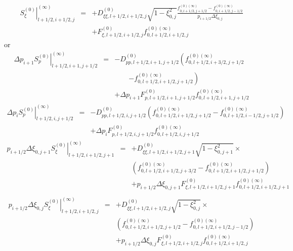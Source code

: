 \begin{eqnarray}
\left. S_{\xi }^{\left( 0\right) }\right| _{l+1/2,i+1/2,j}^{(\infty )}
&=&+D_{\xi \xi ,l+1/2,i+1/2,j}^{\left( 0\right) }\sqrt{1-\xi _{0,j}^{2}}%
\frac{f_{0,i+1/2,j+1/2}^{\left( 0\right) (\infty
)}-f_{0,i+1/2,j-1/2}^{\left( 0\right) (\infty )}}{p_{i+1/2}\Delta \xi _{0,j}}
\nonumber \\
&&+F_{\xi ,l+1/2,i+1/2,j}^{\left( 0\right) }f_{0,l+1/2,i+1/2,j}^{\left(
0\right) (\infty )}
\end{eqnarray}
or
\begin{eqnarray}
\Delta p_{i+1}\left. S_{p}^{\left( 0\right) }\right|
_{l+1/2,i+1,j+1/2}^{(\infty )} &=&-D_{pp,l+1/2,i+1,j+1/2}^{\left( 0\right)
}\left( f_{0,l+1/2,i+3/2,j+1/2}^{\left( 0\right) (\infty
)}\right.\nonumber\\&&\qquad\left.-f_{0,l+1/2,i+1/2,j+1/2}^{\left( 0\right) (\infty )}\right)  \nonumber \\
&&+\Delta p_{i+1}F_{p,l+1/2,i+1,j+1/2}^{\left( 0\right)
}f_{0,l+1/2,i+1,j+1/2}^{\left( 0\right) (\infty )}
\end{eqnarray}
\begin{eqnarray}
\Delta p_{i}\left. S_{p}^{\left( 0\right) }\right| _{l+1/2,i,j+1/2}^{(\infty
)} &=&-D_{pp,l+1/2,i,j+1/2}^{\left( 0\right) }\left(
f_{0,l+1/2,i+1/2,j+1/2}^{\left( 0\right) (\infty
)}-f_{0,l+1/2,i-1/2,j+1/2}^{\left( 0\right) (\infty )}\right)  \nonumber \\
&&+\Delta p_{i}F_{p,l+1/2,i,j+1/2}^{\left( 0\right)
}f_{0,l+1/2,i,j+1/2}^{\left( 0\right) (\infty )}
\end{eqnarray}
\begin{eqnarray}
p_{i+1/2}\Delta \xi _{0,j+1}\left. S_{\xi }^{\left( 0\right) }\right|
_{l+1/2,i+1/2,j+1}^{(\infty )} &=&+D_{\xi \xi ,l+1/2,i+1/2,j+1}^{\left(
0\right) }\sqrt{1-\xi _{0,j+1}^{2}}\times  \nonumber \\
&&\left( f_{0,l+1/2,i+1/2,j+3/2}^{\left( 0\right) (\infty
)}-f_{0,l+1/2,i+1/2,j+1/2}^{\left( 0\right) (\infty )}\right)  \nonumber \\
&&+p_{i+1/2}\Delta \xi _{0,j+1}F_{\xi ,l+1/2,i+1/2,j+1}^{\left( 0\right)
}f_{0,l+1/2,i+1/2,j+1}^{\left( 0\right) (\infty )} \nonumber \\
\end{eqnarray}
\begin{eqnarray}
p_{i+1/2}\Delta \xi _{0,j}\left. S_{\xi }^{\left( 0\right) }\right|
_{l+1/2,i+1/2,j}^{(\infty )} &=&+D_{\xi \xi ,l+1/2,i+1/2,j}^{\left( 0\right)
}\sqrt{1-\xi _{0,j}^{2}}\times  \nonumber \\
&&\left( f_{0,l+1/2,i+1/2,j+1/2}^{\left( 0\right) (\infty
)}-f_{0,l+1/2,i+1/2,j-1/2}^{\left( 0\right) (\infty )}\right)  \nonumber \\
&&+p_{i+1/2}\Delta \xi _{0,j}F_{\xi ,l+1/2,i+1/2,j}^{\left( 0\right)
}f_{0,l+1/2,i+1/2,j}^{\left( 0\right) (\infty )}
\end{eqnarray}

